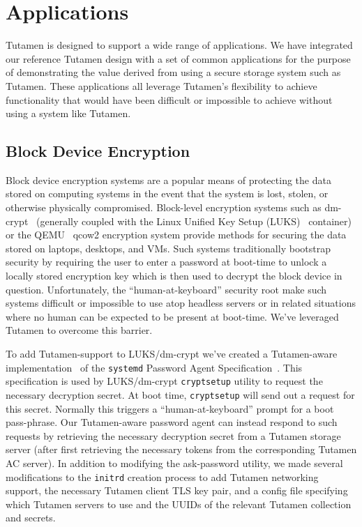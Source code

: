 \section{Applications}
\label{sec:apps}

Tutamen is designed to support a wide range of applications. We have
integrated our reference Tutamen design with a set of common
applications for the purpose of demonstrating the value derived from
using a secure storage system such as Tutamen. These applications all
leverage Tutamen's flexibility to achieve functionality that would
have been difficult or impossible to achieve without using a system
like Tutamen.

\subsection{Block Device Encryption}

Block device encryption systems are a popular means of protecting the
data stored on computing systems in the event that the system is lost,
stolen, or otherwise physically compromised.  Block-level encryption
systems such as dm-crypt~\cite{dm-crypt} (generally coupled with the
Linux Unified Key Setup (LUKS)~\cite{luks} container) or the
QEMU~\cite{qemu} qcow2 encryption system provide methods for securing
the data stored on laptops, desktops, and VMs. Such systems
traditionally bootstrap security by requiring the user to enter a
password at boot-time to unlock a locally stored encryption key which
is then used to decrypt the block device in question. Unfortunately,
the ``human-at-keyboard'' security root make such systems difficult or
impossible to use atop headless servers or in related situations where
no human can be expected to be present at boot-time. We've leveraged
Tutamen to overcome this barrier.

To add Tutamen-support to LUKS/dm-crypt we've created a Tutamen-aware
implementation~\cite{src-tutamen-askpassword} of the \texttt{systemd}
Password Agent Specification~\cite{systemd-passwordagents}. This
specification is used by LUKS/dm-crypt \texttt{cryptsetup} utility to
request the necessary decryption secret. At boot time,
\texttt{cryptsetup} will send out a request for this secret. Normally
this triggers a ``human-at-keyboard'' prompt for a boot
pass-phrase. Our Tutamen-aware password agent can instead respond to
such requests by retrieving the necessary decryption secret from a
Tutamen storage server (after first retrieving the necessary tokens
from the corresponding Tutamen AC server). In addition to modifying
the ask-password utility, we made several modifications to the
\texttt{initrd} creation process to add Tutamen networking support,
the necessary Tutamen client TLS key pair, and a config file
specifying which Tutamen servers to use and the UUIDs of the relevant
Tutamen collection and secrets.

